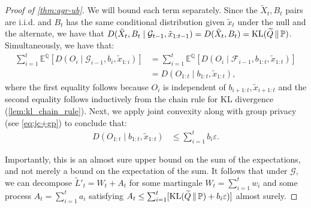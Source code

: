 \documentclass{article}
\DeclareMathOperator{\KLop}{KL}
\newcommand{\KL}[2]{%
  \mathchoice
    {\KLop\!\left(#1\,\middle\|\,#2\right)}%
    {\KLop(#1\,\Vert\,#2)}%
    {\KLop(#1\,\Vert\,#2)}%
    {\KLop(#1\,\Vert\,#2)}%
}
\newcommand{\Null}{\mathbb{P}}
\newcommand{\E}{\mathbb{E}}
\newcommand{\Alt}{\mathbb{Q}}
\newcommand{\M}{\mathcal{M}}
\begin{document}
\begin{proof}[Proof of \cref{thm:agr-ub}]
    We will bound each term separately. Since the $\tilde X_t,B_t$ pairs are i.i.d. and $B_t$ has the same conditional distribution given $\tilde x_t$ under the null and the alternate, we have that $D(\tilde X_t, B_t \mid \mathcal{G}_{t-1}, \tilde x_{1:t-1}) = D(\tilde X_t, B_t) = \KL{\widetilde Q}{\Null}$. 
    Simultaneously, we have that:
    \begin{align*}
    \sum_{i=1}^t  \E^\Alt[D(O_i \mid \mathcal{G}_{i-1}, b_i, \tilde x_{1:i})]
    &=
    \sum_{i=1}^t  \E^\Alt[D(O_i \mid \mathcal{F}_{i-1}, b_{1:t}, \tilde x_{1:t})]  \\
    &=
    D(O_{1:t} \mid b_{1:t}, \tilde x_{1:t}),
    \end{align*}
    where the first equality follows because $O_i$ is independent of $b_{i+1: t}, \tilde x_{i+1: t}$ and the second equality follows inductively from the chain rule for KL divergence (\cref{lem:kl_chain_rule}). Next, we apply joint convexity along with group privacy (see \cref{eq:jc+gp}) to conclude that:
    \begin{align*}
    D(O_{1:t} \mid b_{1:t}, \tilde x_{1:t})
    &\leq \sum_{i=1}^t b_i \varepsilon.
    \end{align*}

    
    Importantly, this is an almost sure upper bound on the sum of the expectations, and not merely a bound on the expectation of the sum. It follows that under $\mathcal{G}$, we can decompose $\tilde L'_t = W_t + A_t$ for some martingale $W_t = \sum_{i=1}^t w_i$ and some process $A_t = \sum_{i=1}^t a_i$ satisfying $A_t \leq \sum_{i=1}^t [\KL{\widetilde Q}{\Null} + b_i\varepsilon)]$ almost surely.



\end{proof}
\end{document}
